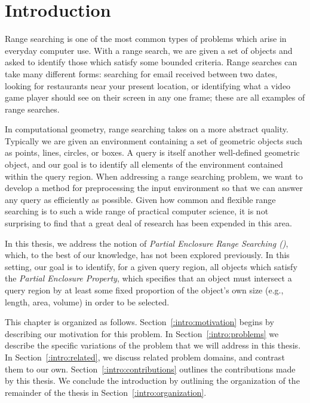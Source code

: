 \chapter{Introduction}
\label{:intro}

Range searching is one of the most common types of problems which arise in everyday computer use. 
With a range search, we are given a set of objects and asked to identify those which satisfy some bounded criteria. 
Range searches can take many different forms: searching for email received between two dates, looking for restaurants near your present location, or identifying what a video game player should see on their screen in any one frame; these are all examples of range searches.

In computational geometry, range searching takes on a more abstract quality. 
Typically we are given an environment containing a set of geometric objects such as points, lines, circles, or boxes. 
A query is itself another well-defined geometric object, and our goal is to identify all elements of the environment contained within the query region.  
When addressing a range searching problem, we want to develop a method for preprocessing the input environment so that we can answer any query as efficiently as possible.
Given how common and flexible range searching is to such a wide range of practical computer science, it is not surprising to find that a great deal of research has been expended in this area.  

In this thesis, we address the notion of \emph{Partial Enclosure Range Searching (\PERS{})}, which, to the best of our knowledge, has not been explored previously. 
In this setting, our goal is to identify, for a given query region, all objects which satisfy the \emph{Partial Enclosure Property}, which specifies that an object must intersect a query region by at least some fixed proportion of the object's own size (e.g., length, area, volume) in order to be selected.

This chapter is organized as follows.
Section~\ref{:intro:motivation} begins by describing our motivation for this problem. 
In Section~\ref{:intro:problems} we describe the specific variations of the \PERS{} problem that we will address in this thesis. 
In Section~\ref{:intro:related}, we discuss related problem domains, and contrast them to our own.
Section~\ref{:intro:contributions} outlines the contributions made by this thesis.
We conclude the introduction by outlining the organization of the remainder of the thesis in Section~\ref{:intro:organization}.


